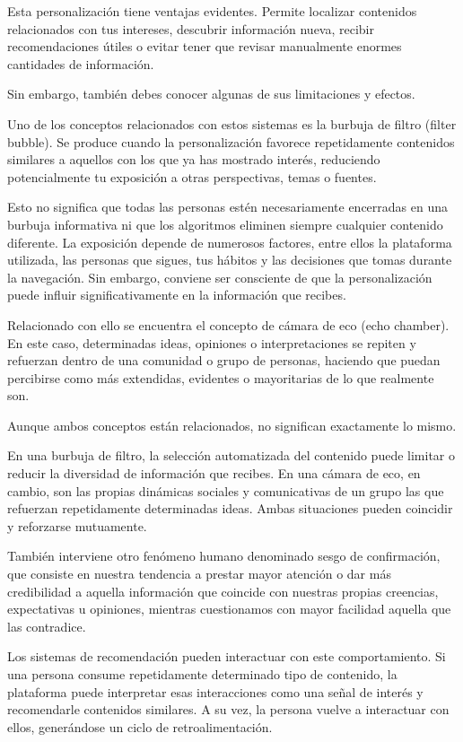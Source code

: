 \documentclass[
  spanish,
  a4paper,
  openany]{book}
\begin{document}
Esta personalización tiene ventajas evidentes. Permite localizar contenidos relacionados con tus intereses, descubrir información nueva, recibir recomendaciones útiles o evitar tener que revisar manualmente enormes cantidades de información.

Sin embargo, también debes conocer algunas de sus limitaciones y efectos.

Uno de los conceptos relacionados con estos sistemas es la burbuja de filtro (filter bubble). Se produce cuando la personalización favorece repetidamente contenidos similares a aquellos con los que ya has mostrado interés, reduciendo potencialmente tu exposición a otras perspectivas, temas o fuentes.

Esto no significa que todas las personas estén necesariamente encerradas en una burbuja informativa ni que los algoritmos eliminen siempre cualquier contenido diferente. La exposición depende de numerosos factores, entre ellos la plataforma utilizada, las personas que sigues, tus hábitos y las decisiones que tomas durante la navegación. Sin embargo, conviene ser consciente de que la personalización puede influir significativamente en la información que recibes.

Relacionado con ello se encuentra el concepto de cámara de eco (echo chamber). En este caso, determinadas ideas, opiniones o interpretaciones se repiten y refuerzan dentro de una comunidad o grupo de personas, haciendo que puedan percibirse como más extendidas, evidentes o mayoritarias de lo que realmente son.

Aunque ambos conceptos están relacionados, no significan exactamente lo mismo.

En una burbuja de filtro, la selección automatizada del contenido puede limitar o reducir la diversidad de información que recibes. En una cámara de eco, en cambio, son las propias dinámicas sociales y comunicativas de un grupo las que refuerzan repetidamente determinadas ideas. Ambas situaciones pueden coincidir y reforzarse mutuamente.

También interviene otro fenómeno humano denominado sesgo de confirmación, que consiste en nuestra tendencia a prestar mayor atención o dar más credibilidad a aquella información que coincide con nuestras propias creencias, expectativas u opiniones, mientras cuestionamos con mayor facilidad aquella que las contradice.

Los sistemas de recomendación pueden interactuar con este comportamiento. Si una persona consume repetidamente determinado tipo de contenido, la plataforma puede interpretar esas interacciones como una señal de interés y recomendarle contenidos similares. A su vez, la persona vuelve a interactuar con ellos, generándose un ciclo de retroalimentación.
\end{document}
